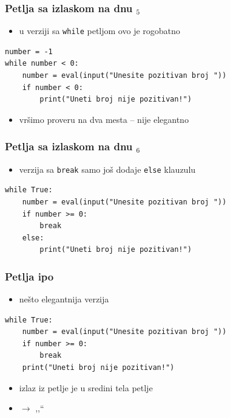 \documentclass[utf8,compress]{beamer}
\begin{document}
\begin{frame}[fragile]
  \frametitle{Petlja sa izlaskom na dnu $_5$}
  \begin{itemize}
    \item u verziji sa \texttt{while} petljom ovo je rogobatno
  \end{itemize}
\begin{verbatim}
number = -1
while number < 0:
    number = eval(input("Unesite pozitivan broj "))
    if number < 0:
        print("Uneti broj nije pozitivan!")
\end{verbatim}
  \begin{itemize}
    \item vršimo proveru na dva mesta -- nije elegantno
  \end{itemize}
\end{frame}

\begin{frame}[fragile]
  \frametitle{Petlja sa izlaskom na dnu $_6$}
  \begin{itemize}
    \item verzija sa \texttt{break} samo još dodaje \texttt{else} klauzulu
  \end{itemize}
\begin{verbatim}
while True:
    number = eval(input("Unesite pozitivan broj "))
    if number >= 0:
        break
    else:
        print("Uneti broj nije pozitivan!")
\end{verbatim}
\end{frame}

\begin{frame}[fragile]
  \frametitle{Petlja ipo}
  \begin{itemize}
    \item nešto elegantnija verzija
  \end{itemize}
\begin{verbatim}
while True:
    number = eval(input("Unesite pozitivan broj "))
    if number >= 0: 
        break
    print("Uneti broj nije pozitivan!")
\end{verbatim}
  \begin{itemize}
    \item izlaz iz petlje je u sredini tela petlje
    \item $\rightarrow$ ,,``
  \end{itemize}
\end{frame}
\end{document}
